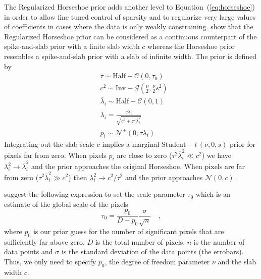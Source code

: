 \documentclass[linenumbers,modern]{aastex62}
\begin{document}
The Regularized Horseshoe prior adds another level to Equation~(\ref{eq:horseshoe}) in order to allow fine tuned control of sparsity and to regularize very large values of coefficients in cases where the data is only weakly constraining.
\cite{piironen2017} show that the Regularized Horseshoe prior can be considered as a continuous counterpart of the spike-and-slab prior with a finite slab width $c$ whereas the Horseshoe prior resembles a spike-and-slab prior with a slab of infinite width.
The prior is defined by
\begin{equation}
\begin{aligned}
    &\tau  \sim \mathrm{Half}-\mathcal{C}\left(0, \tau_{0}\right)\\
    &c^{2}  \sim \mathrm{Inv}-\mathcal{G}\left(\frac{\nu}{2}, \frac{\nu}{2} s^{2}\right) \\
    &\overline{\lambda}_{i}  \sim \mathrm{Half}-\mathcal{C}(0,1)\\
    &\lambda_{i} =\frac{c \overline{\lambda}_{i}}{\sqrt{c^{2}+\tau^{2} \overline{\lambda}_{i}^{2}}} \\
    &p_{i}  \sim \mathcal{N}^+\left(0, \tau \lambda_{i}\right) 
\end{aligned}
    \label{eq:reg_horseshoe}
\end{equation}
Integrating out the slab scale $c$ implies a marginal $\mathrm{Student}-\mathit{t}\,(\nu,0,s)$ prior for pixels far from zero.
When pixels $p_i$ are close to zero ($\tau^2\overline{\lambda}_i^2\ll c^2$) we have $\lambda_i^2\rightarrow\overline{\lambda}_i^2$ and the prior approaches the original Horseshoe.
When pixels are far from zero ($\tau^2\overline{\lambda}_i^2\gg c^2$) then $\lambda_i^2\rightarrow c^2/\tau^2$ and the prior approaches $\mathcal{N}(0, c)$.

\cite{piironen2017} suggest the following expression to set the scale parameter $\tau_0$ which is an estimate of the global scale of the pixels 
\begin{equation}
    \tau_0=\frac{p_0}{D-p_0}\frac{\sigma}{\sqrt{n}}
    \quad,
    \label{eq:horseshoe_tau0}
\end{equation}
where $p_0$ is our prior guess for the number of significant pixels that are sufficiently far above zero, $D$ is the total number of pixels, $n$ is the number of data points and $\sigma$ is the standard deviation of the data points (the errobars).
Thus, we only need to specify $p_0$, the degree of freedom parameter $\nu$ and the slab width $c$.
\end{document}
